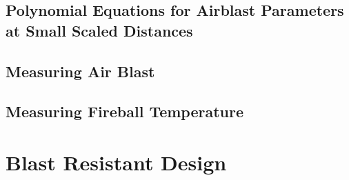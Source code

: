 \subsection{Polynomial Equations for Airblast Parameters at Small Scaled Distances}
\lipsum[10]
\subsection{Measuring Air Blast}
\lipsum[10]
\subsection{Measuring Fireball Temperature}
\lipsum[10]

\section{Blast Resistant Design}
\lipsum[10]

\endinput
